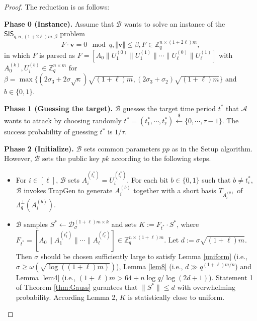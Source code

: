 \documentclass[runningheads]{llncs}
\def\cal{\mathcal}
\begin{document}
\begin{proof}
The reduction is as follows:
\begin{description}
\item  \textbf{Phase 0 (Instance).} Assume that $\mathcal{B}$ wants to solve an instance of the $\mathsf{SIS}_{q,n,(1+2\ell)m, \beta}$ problem 
\begin{equation}\label{key}
F\cdot \mathbf{v}=0 \mod q, \Vert  \mathbf{v} \Vert \leq \beta, F\in \mathbb{Z}_q^{n\times (1+2\ell)m},
\end{equation}
in which $F$ is parsed as 
$ F = \left[ A_0 \|U_1^{(0)} \|U_1^{(1)}\| \cdots \|U_\ell^{(0)}\|U_\ell^{(1)} \right]$
with $ A^{(k)}_0, U_i^{(b)} \in \mathbb{Z}_q^{n\times m}$ for  $\beta=\max\{(2\sigma_3+2\sigma\sqrt{\kappa})\sqrt{(1+\ell)m}, (2\sigma_3+\sigma_2)\sqrt{(1+\ell)m}\}$ and $b \in \{0,1\}$.





\item  \textbf{Phase 1 (Guessing the target).} $\cal{B}$ guesses the target time period $t^*$ that 
$\cal{A}$ wants to attack by choosing randomly $t^*=(t^*_1,\cdots, t^*_\ell) \xleftarrow{\$} \{0, \cdots, \tau-1\}$. 
The success probability of guessing $t^*$ is $1/\tau$.

\item  \textbf{Phase 2 (Initialize).} $\cal{B}$ sets common parameters $pp$ as in the \textsf{Setup} algorithm. 
However, $\cal{B}$ sets the public key $pk$ according to the following steps.
\begin{itemize}
	\item  For $i \in [\ell]$, $\cal{B}$ sets $A_i^{(t^*_i)}=U_i^{(t^*_i)}$. For each bit $b\in \{0,1\}$ such that $ b \neq t^*_i$, $\cal{B}$ invokes \textsf{TrapGen} to generate $A_i^{(b)}$ together with a short basis $T_{A_i^{(b)}}$ of $\Lambda_q^{\bot}(A_i^{(b)})$.

\item $\cal{B}$ samples $S^* \leftarrow \cal{D}_\sigma^{(1+\ell)m\times k}$ 
and sets $K:=F_{t^*}\cdot S^*$, where $F_{t^*}= \left[ A_0 \|A_1^{(t^*_1)}\| \cdots \|A_\ell^{(t^*_\ell)} \right] \in \mathbb{Z}_q^{n\times (1+\ell)m}$.  
Let $d:=\sigma\sqrt{(1+\ell)m}$. 
Then $\sigma$ should be chosen sufficiently large to satisfy Lemma \ref{uniform} (i.e., $\sigma \geq \omega(\sqrt{\log ((1+\ell)m)})$), 
Lemma \ref{lem8} (i.e., $d \gg q^{(1+\ell)m/n}$) and Lemma \ref{lem4} (i.e., $(1+\ell)m>64+n\log q/\log(2d+1)$).
Statement 1 of Theorem \ref{thm:Gauss} gurantees that 
$\|S^*\| \leq d$ with overwhelming probability. 
According Lemma 2, $K$ is statistically close to uniform. %


\end{itemize}
\end{description}
\end{proof}
\end{document}
